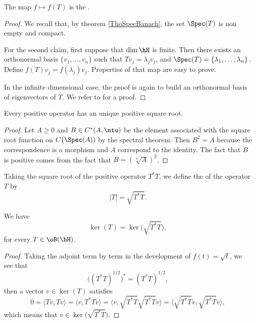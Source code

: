 The map $f\mapsto f(T)$ is the .

\begin{proof}

	We recall that, by theorem \ref{ThoSpecBanach}, the set $\Spec(T)$ is non empty and compact.

	For the second claim, first suppose that $\dim\hH$ is finite. Then there exists an orthonormal basis $\{ v_1,\ldots,v_n \}$ such that $Tv_j=\lambda_jv_j$, and $\Spec(T)=\{ \lambda_1,\ldots,\lambda_n \}$. Define $f(T)v_j=f(\lambda_j)v_j$. Properties of that map are easy to prove.

	In the infinite dimensional case, the proof is again to build an orthonormal basis of eigenvectors of $T$. We refer to \cite{Wassermann,Landsman} for a proof.
\end{proof}

\begin{corollary}
Every positive operator has an unique positive square root.
\end{corollary}

\begin{proof}
	Let $A\geq 0$ and $B\in C^*(A,\mtu)$ be the element associated with the square root function on $C\big(\Spec(A))$ by the spectral theorem. Then $B^2=A$ because the correspondence is a morphism and $A$ correspond to the identity. The fact that $B$ is positive comes from the fact that $B=\left( \sqrt[4]{A} \right)^2$.
\end{proof}

Taking the square root of the positive operator $T^*T$, we define the  of the operator $T$ by
\begin{equation}		\label{EqAbsValT}
	| T |=\sqrt{T^*T}.
\end{equation}

\begin{lemma}		\label{LemkerTkersqrtT}
We have
\[ 
 \ker(T)=\ker\big( \sqrt{T^*T} \big),
\]
for every $T\in\oB(\hH)$.
\end{lemma}

\begin{proof}
	Taking the adjoint term by term in the development of $f(t)=\sqrt{t}$, we see that 
	\[ 
	  \Big( (T^*T)^{1/2} \Big)^*=(T^*T)^{1/2}, 
	\]
	then a vector $v\in\ker(T)$ satisfies
	\[ 
	  0=\langle Tv, Tv\rangle =\langle v, T^*Tv\rangle =\langle v,\sqrt{T^*T}\sqrt{T^*T}v \rangle =\langle \sqrt{T^*T}v, \sqrt{T^*T}v\rangle,
	\]
	which means that $v\in\ker\big( \sqrt{T^*T} \big)$.
\end{proof}



